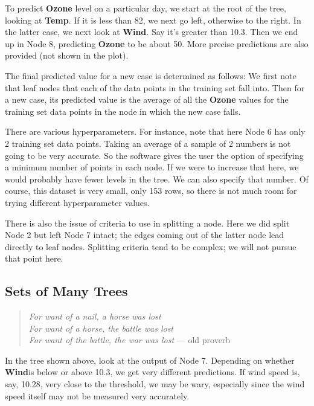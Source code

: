 To predict \textbf{Ozone} level on a particular day, we start at the
root of the tree, looking at \textbf{Temp}.  If it is less than 82, we
next go left, otherwise to the right.  In the latter case, we next look
at \textbf{Wind}.  Say it's greater than 10.3.  Then we end up in Node
8, predicting \textbf{Ozone} to be about 50.  More precise predictions
are also provided (not shown in the plot).

The final predicted value for a new case is determined as follows:  We
first note that leaf nodes that each of the data points in the training set
fall into.  Then for a new case, its predicted value is the average of
all the \textbf{Ozone} values for the training set data points in the
node in which the new case falls.

There are various hyperparameters.  For instance, note that here Node 6
has only 2 training set data points.  Taking an average of a sample of 2
numbers is not going to be very accurate.  So the software gives the
user the option of specifying a minimum number of points in each node.
If we were to increase that here, we would probably have fewer levels in
the tree.  We can also specify that number.  Of course, this dataset is
very small, only 153 rows, so there is not much room for trying
different hyperparameter values.

There is also the issue of criteria to use in splitting a node.  Here we
did split Node 2 but left Node 7 intact; the edges coming out of the
latter node lead directly to leaf nodes.  Splitting criteria tend to be
complex; we will not pursue that point here.

\subsection{Sets of Many Trees}


\noindent
\begin{quote}
{\it
For want of a nail, a horse was lost \\
For want of a horse, the battle was lost \\
For want of the battle, the war was lost
} --- old proverb
\end{quote}

In the tree shown above, look at the output of Node 7.  Depending on
whether \textbf{Wind}is below or above 10.3, we get very different
predictions.  If wind speed is, say, 10.28, very close to the threshold,
we may be wary, especially since the wind speed itself may not be
measured very accurately.

